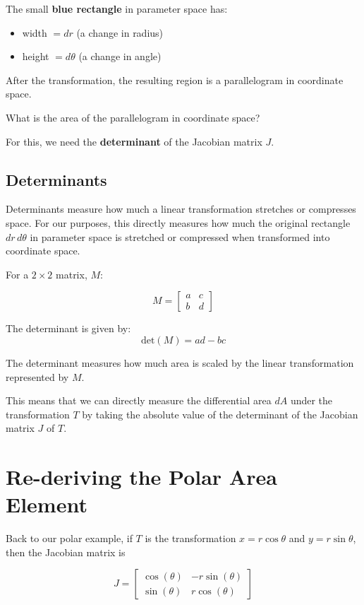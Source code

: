 \documentclass{ximera}
\begin{document}
The small \textbf{blue rectangle} in parameter space has:
\begin{itemize}
  \item width $= dr$ (a change in radius)
  \item height $= d\theta$ (a change in angle)
\end{itemize}

After the transformation, the resulting region is a parallelogram in coordinate space. 

What is the area of the parallelogram in coordinate space?

For this, we need the \textbf{determinant} of the Jacobian matrix $J$.


\subsection*{Determinants}

Determinants measure how much a linear transformation stretches or compresses space. For our purposes, this directly measures how much the original rectangle $dr\,d\theta$ in parameter space is stretched or compressed when transformed into coordinate space.

\begin{definition}
For a $2\times 2$ matrix, $M$:

$$M=\begin{bmatrix} a & c \\ b & d \end{bmatrix}$$

The determinant is given by:
$$\text{det}(M) = ad - bc$$

The determinant measures how much area is scaled by the linear transformation represented by $M$.

\end{definition}

This means that we can directly measure the differential area $dA$ under the transformation $T$ by taking the absolute value of the determinant of the Jacobian matrix $J$ of $T$.

\section*{Re-deriving the Polar Area Element}

Back to our polar example, if $T$ is the transformation $x=r\cos\theta$ and $y=r\sin\theta$, then the Jacobian matrix is

$$J = \begin{bmatrix}
    \cos(\theta) & -r\sin(\theta) \\[6pt]
    \sin(\theta) & r\cos(\theta)
  \end{bmatrix}$$
\end{document}

